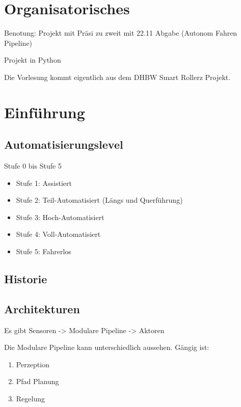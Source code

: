 \documentclass[a4paper]{article}
\title{\docTitle}
\author{Moritz}
\date{\today}
\begin{document}
\maketitle
\tableofcontents


\section{Organisatorisches}

Benotung: Projekt mit Präsi zu zweit mit 22.11 Abgabe (Autonom Fahren Pipeline)

Projekt in Python

Die Vorlesung kommt eigentlich aus dem DHBW Smart Rollerz Projekt.

\section{Einführung}

\subsection{Automatisierungslevel}

Stufe 0 bis Stufe 5

\begin{itemize}
    \item Stufe 1: Assistiert
    \item Stufe 2: Teil-Automatisiert (Längs und Querführung)
    \item Stufe 3: Hoch-Automatisiert
    \item Stufe 4: Voll-Automatisiert
    \item Stufe 5: Fahrerlos
\end{itemize}

\subsection{Historie}

\subsection{Architekturen}

Es gibt Sensoren -> Modulare Pipeline -> Aktoren

Die Modulare Pipeline kann unterschiedlich aussehen. Gängig ist:

\begin{enumerate}
    \item Perzeption
    \item Pfad Planung
    \item Regelung
\end{enumerate}
\end{document}
